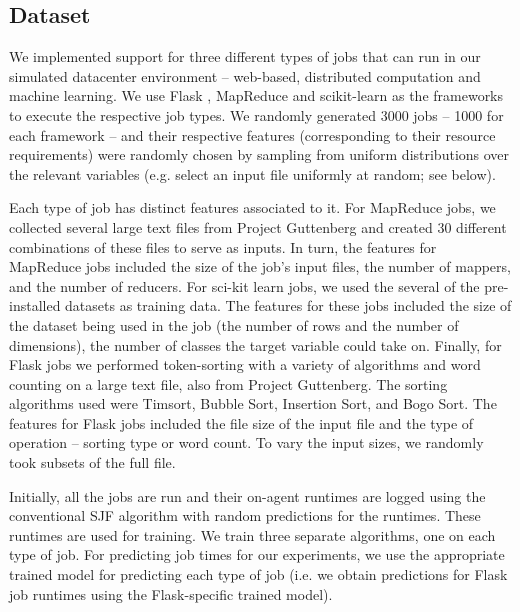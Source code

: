 \documentclass{hotnets19}
\begin{document}
\subsection{Dataset}
We implemented support for three different types of jobs that can run in our simulated datacenter environment -- web-based, distributed computation and machine learning.
We use Flask \cite{Flask}, MapReduce \cite{dean2008mapreduce} and scikit-learn \cite{scikit-learn} as the frameworks to execute the respective job types. We randomly generated 3000 jobs -- 1000 for each framework -- and their respective features (corresponding to their resource requirements) were randomly chosen by sampling from uniform distributions over the relevant variables (e.g. select an input file uniformly at random; see below).

Each type of job has distinct features associated to it. For MapReduce jobs, we collected several large text files from Project Guttenberg \cite{guttenberg} and created 30 different combinations of these files to serve as inputs. In turn, the features for MapReduce jobs included the size of the job's input files, the number of mappers, and the number of reducers. For sci-kit learn jobs, we used the several of the pre-installed datasets as training data. The features for these jobs included the size of the dataset being used in the job (the number of rows and the number of dimensions), the number of classes the target variable could take on. Finally, for Flask jobs we performed token-sorting with a variety of algorithms and word counting on a large text file, also from Project Guttenberg. The sorting algorithms used were Timsort, Bubble Sort, Insertion Sort, and Bogo Sort. The features for Flask jobs included the file size of the input file and the type of operation -- sorting type or word count. To vary the input sizes, we randomly took subsets of the full file. 

Initially, all the jobs are run and their on-agent runtimes are logged using the conventional SJF algorithm with random predictions for the runtimes.
These runtimes are used for training. We train three separate algorithms, one on each type of job. For predicting job times for our experiments, we use the appropriate trained model for predicting each type of job (i.e. we obtain predictions for Flask job runtimes using the Flask-specific trained model).
\end{document}

